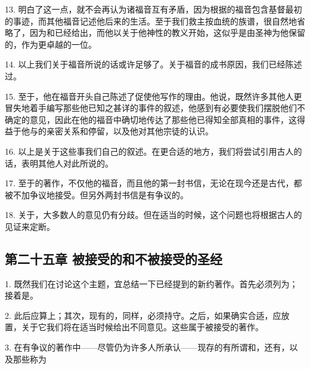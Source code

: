 13. 明白了这一点，就不会再认为诸福音互有矛盾，因为根据的福音包含基督最初的事迹，而其他福音记述他后来的生活。至于我们救主按血统的族谱，很自然地省略了，因为和已经给出，而他以关于他神性的教义开始，这似乎是由圣神为他保留的，作为更卓越的一位。\par

14. 以上我们关于福音所说的话或许足够了。关于福音的成书原因，我们已经陈述过。\par

15. 至于，他在福音开头自己陈述了促使他写作的理由。他说，既然许多其他人更冒失地着手编写那些他已知之甚详的事件的叙述，他感到有必要使我们摆脱他们不确定的意见，因此在他的福音中确切地传达了那些他已得知全部真相的事件，这得益于他与的亲密关系和停留，以及他对其他宗徒的认识。\par

16. 以上是关于这些事我们自己的叙述。在更合适的地方，我们将尝试引用古人的话，表明其他人对此所说的。\par

17. 至于的著作，不仅他的福音，而且他的第一封书信，无论在现今还是古代，都被不加争议地接受。但另外两封书信是有争议的。\par

18. 关于，大多数人的意见仍有分歧。但在适当的时候，这个问题也将根据古人的见证来定断。\par


\subsection{第二十五章 被接受的和不被接受的圣经}

1. 既然我们在讨论这个主题，宜总结一下已经提到的新约著作。首先必须列为；接着是。\par

2. 此后应算上；其次，现有的，同样，必须持守。之后，如果确实合适，应放置，关于它我们将在适当时候给出不同意见。这些属于被接受的著作。\par

3. 在有争议的著作中——尽管仍为许多人所承认——现存的有所谓和，还有，以及那些称为\par

